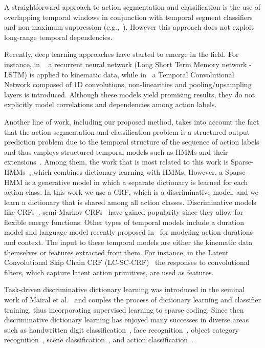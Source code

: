 \documentclass[10pt,twocolumn,letterpaper]{article}
\begin{document}
A straightforward approach to action segmentation and classification is the use of overlapping temporal windows in conjunction with temporal segment classifiers and non-maximum suppression (e.g.,~\cite{Rohrbach:CVPR12, Oneata:ICCV13}). However this approach does not exploit long-range temporal dependencies.

Recently, deep learning approaches have started to emerge in the field. For instance, in ~\cite{Dipietro:MICCAI16} a recurrent neural network (Long Short Term Memory network - LSTM) is applied to kinematic data, while in~\cite{Lea:CVPR17} a Temporal Convolutional Network composed of 1D convolutions, non-linearities and pooling/upsampling layers is introduced. Although these models yield promising results, they do not explicitly model correlations and dependencies among action labels.

Another line of work, including our proposed method, takes into account the fact that the action segmentation and classification problem is a structured output prediction problem due to the temporal structure of the sequence of action labels and thus employs structured temporal models  such as HMMs and their extensions~\cite{Tao:IPCAI12,Kuehne:CVPR14,Kuehne:WACV16}. Among them, the work that is most related to this work is  Sparse-HMMs~\cite{Tao:IPCAI12}, which combines dictionary learning with HMMs. However, a Sparse-HMM is a generative model in which a separate dictionary is learned for each action class. In this work we use a CRF, which is a discriminative model, and we learn a dictionary that is shared among all action classes. Discriminative models like CRFs~\cite{Lea:WACV15,Lea:ICRA16}, semi-Markov CRFs~\cite{Tao:MICCAI13} have gained popularity since they allow for flexible energy functions. Other types of temporal models include a duration model and language model recently proposed in~\cite{Richard:CVPR16} for modeling action durations and context. The input to these temporal models are either the kinematic data themselves or features extracted from them. For instance, in the Latent Convolutional Skip Chain CRF (LC-SC-CRF)~\cite{Lea:ICRA16} the responses to convolutional filters, which capture latent action primitives, are used as features. 


Task-driven discriminative dictionary learning was introduced in the seminal work of Mairal et al.~\cite{Mairal:NIPS09} and couples the process of dictionary learning and classifier training, thus incorporating supervised learning to sparse coding. Since then discriminative dictionary learning has enjoyed many successes in diverse areas such as handwritten digit classification~\cite{Mairal:PAMI12,Yang:CVPR10-supervised}, face recognition~\cite{Jiang:CVPR11,Yang:CVPR10-supervised,Quan:CVPR16}, object category recognition~\cite{Jiang:CVPR11,Quan:CVPR16,Boureau:CVPR10}, scene classification~\cite{Boureau:CVPR10,Lian:ECCV10,Quan:CVPR16}, and action classification~\cite{Quan:CVPR16}.
\end{document}
